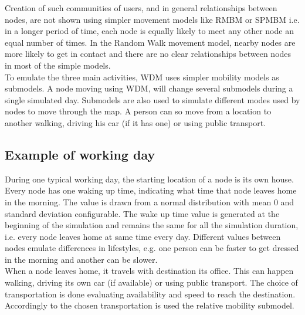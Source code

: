 Creation of such communities of users, and in general relationships between nodes, are not shown using simpler movement models like RMBM or SPMBM i.e. in a longer period of time, each node is equally likely to meet any other node an equal number of times. In the Random Walk movement model, nearby nodes are more likely to get in contact and there are no clear relationships between nodes in most of the simple models.
\\

To emulate the three main activities, WDM uses simpler mobility models as submodels. A node moving using WDM, will change several submodels during a single simulated day. Submodels are also used to simulate different modes used by nodes to move through the map. A person can so move from a location to another walking, driving his car (if it has one) or using public transport.
\\


\subsection{Example of working day}
During one typical working day, the starting location of a node is its own house. Every node has one waking up time, indicating what time that node leaves home in the morning. The value is drawn from a normal distribution with mean 0 and standard deviation configurable. The wake up time value is generated at the beginning of the simulation and remains the same for all the simulation duration, i.e. every node leaves home at same time every day. Different values between nodes emulate differences in lifestyles, e.g. one person can be faster to get dressed in the morning and another can be slower.
\\ 

When a node leaves home, it travels with destination its office. This can happen walking, driving its own car (if available) or using public transport. The choice of transportation is done evaluating availability and speed to reach the destination. Accordingly to the chosen transportation is used the relative mobility submodel.
\\

